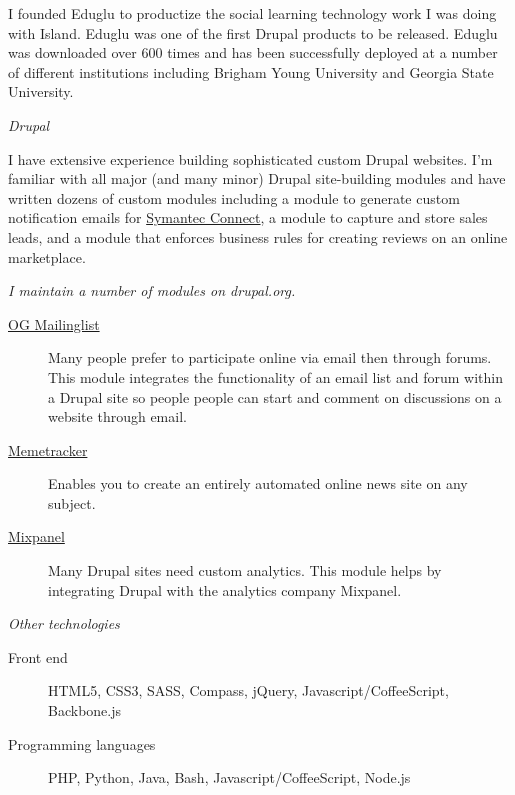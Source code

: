 \documentclass[11pt]{article}
\begin{document}
\bigskip


\noindent I founded Eduglu to productize the social learning technology work I was doing with Island. Eduglu was one of the first Drupal products to be released. Eduglu was downloaded over 600 times and has been successfully deployed at a number of different institutions including Brigham Young University and Georgia State University.

\newpage

\medskip

\noindent\emph{Drupal \vspace{0.15in}}

\noindent I have extensive experience building sophisticated custom Drupal websites. I'm familiar with all major (and many minor) Drupal site-building modules and have written dozens of custom modules including a module to generate custom notification emails for \href{http://www.symantec.com/connect/}{Symantec Connect}, a module to capture and store sales leads, and a module that enforces business rules for creating reviews on an online marketplace.

\bigskip

\noindent \emph{I maintain a number of modules on drupal.org.}

\begin{description}
  \item[\href{http://drupal.org/project/og_mailinglist}{OG Mailinglist}] Many people prefer to participate online via email then through forums. This module integrates the functionality of an email list and forum within a Drupal site so people people can start and comment on discussions on a website through email.
  \item[\href{http://drupal.org/project/memetracker}{Memetracker}] Enables you to create an entirely automated online news site on any subject.
  \item[\href{http://drupal.org/project/mixpanel}{Mixpanel}] Many Drupal sites need custom analytics. This module helps by integrating Drupal with the analytics company Mixpanel.
\end{description}

\medskip

\noindent\emph{Other technologies}

\begin{description}
  \item[Front end] HTML5, CSS3, SASS, Compass, jQuery, Javascript/CoffeeScript, Backbone.js
  \item[Programming languages] PHP, Python, Java, Bash, Javascript/CoffeeScript, Node.js
\end{description}
\end{document}
